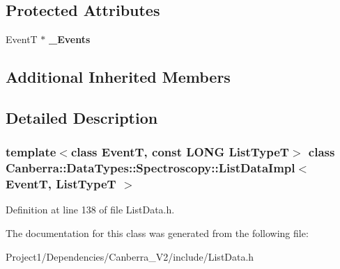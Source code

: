 \subsection*{Protected Attributes}
\begin{DoxyCompactItemize}
\item 
\mbox{\label{class_canberra_1_1_data_types_1_1_spectroscopy_1_1_list_data_impl_acc16ba39909425c08dc86a49efb5eefa}} 
EventT $\ast$ {\bfseries \+\_\+\+Events}
\end{DoxyCompactItemize}
\subsection*{Additional Inherited Members}


\subsection{Detailed Description}
\subsubsection*{template$<$class EventT, const L\+O\+NG List\+TypeT$>$\newline
class Canberra\+::\+Data\+Types\+::\+Spectroscopy\+::\+List\+Data\+Impl$<$ Event\+T, List\+Type\+T $>$}



Definition at line 138 of file List\+Data.\+h.



The documentation for this class was generated from the following file\+:\begin{DoxyCompactItemize}
\item 
Project1/\+Dependencies/\+Canberra\+\_\+\+V2/include/List\+Data.\+h\end{DoxyCompactItemize}
